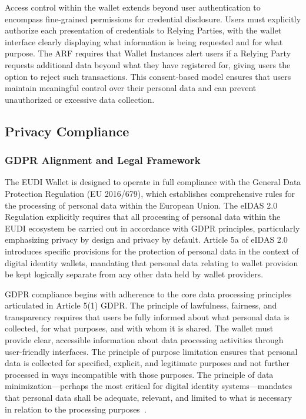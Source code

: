 \documentclass[sigconf,balance,nonacm,authordraft]{acmart}
\begin{document}
Access control within the wallet extends beyond user authentication to encompass fine-grained permissions for credential disclosure. Users must explicitly authorize each presentation of credentials to Relying Parties, with the wallet interface clearly displaying what information is being requested and for what purpose. The ARF requires that Wallet Instances alert users if a Relying Party requests additional data beyond what they have registered for, giving users the option to reject such transactions. This consent-based model ensures that users maintain meaningful control over their personal data and can prevent unauthorized or excessive data collection.

\subsection{Privacy Compliance}

\subsubsection{GDPR Alignment and Legal Framework}

The EUDI Wallet is designed to operate in full compliance with the General Data Protection Regulation (EU 2016/679), which establishes comprehensive rules for the processing of personal data within the European Union. The eIDAS 2.0 Regulation explicitly requires that all processing of personal data within the EUDI ecosystem be carried out in accordance with GDPR principles, particularly emphasizing privacy by design and privacy by default. Article 5a of eIDAS 2.0 introduces specific provisions for the protection of personal data in the context of digital identity wallets, mandating that personal data relating to wallet provision be kept logically separate from any other data held by wallet providers.

GDPR compliance begins with adherence to the core data processing principles articulated in Article 5(1) GDPR. The principle of lawfulness, fairness, and transparency requires that users be fully informed about what personal data is collected, for what purposes, and with whom it is shared. The wallet must provide clear, accessible information about data processing activities through user-friendly interfaces. The principle of purpose limitation ensures that personal data is collected for specified, explicit, and legitimate purposes and not further processed in ways incompatible with those purposes. The principle of data minimization—perhaps the most critical for digital identity systems—mandates that personal data shall be adequate, relevant, and limited to what is necessary in relation to the processing purposes~\cite{ZKPDiscussion_Recital15}.
\end{document}

